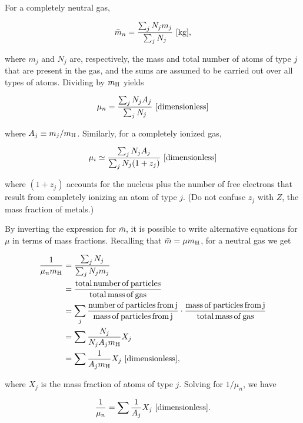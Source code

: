 \documentclass[a4paper,10pt]{article}
\begin{document}
{\noindent}For a completely neutral gas,

\begin{align*}
    \bar{m}_n = \dfrac{\sum_j N_jm_j}{\sum_j N_j} ~ [{\rm kg}],
\end{align*}

{\noindent}where $m_j$ and $N_j$ are, respectively, the mass and total number of atoms of type $j$ that are present in the gas, and the sums are assumed to be carried out over all types of atoms. Dividing by $m_{\rm H}$ yields

\begin{align*}
    \mu_n = \dfrac{\sum_j N_jA_j}{\sum_j N_j} ~ [{\rm dimensionless}]
\end{align*}

{\noindent}where $A_j\equiv m_j/m_{\rm H}$. Similarly, for a completely ionized gas,


\begin{align*}
    \mu_i \simeq \dfrac{\sum_j N_jA_j}{\sum_j N_j(1+z_j)} ~ [{\rm dimensionless}]
\end{align*}

{\noindent}where $(1+z_j)$ accounts for the nucleus plus the number of free electrons that result from completely ionizing an atom of type $j$. (Do not confuse $z_j$ with $Z$, the mass fraction of metals.)

{\noindent}By inverting the expression for $\bar{m}$, it is possible to write alternative equations for $\mu$ in terms of mass fractions. Recalling that $\bar{m}=\mu m_{\rm H}$, for a neutral gas we get

\begin{align*}
    \frac{1}{\mu_nm_{\rm H}} &= \dfrac{\sum_j N_j}{\sum_j N_jm_j} \\
    &= \frac{\rm total\,number\,of\,particles}{\rm total\,mass\,of\,gas} \\
    &= \sum_j \frac{\rm number\,of\,particles\,from\,j}{\rm mass\,of\,particles\,from\,j} \cdot \frac{\rm mass\,of\,particles\,from\,j}{\rm total\,mass\,of\,gas} \\
    &= \sum \frac{N_j}{N_jA_jm_{\rm H}} X_j \\
    &= \sum \frac{1}{A_jm_{\rm H}} X_j ~ [{\rm dimensionless}],
\end{align*}

{\noindent}where $X_j$ is the mass fraction of atoms of type $j$. Solving for $1/\mu_n$, we have

\begin{align*}
    \frac{1}{\mu_n} = \sum \frac{1}{A_j} X_j ~ [{\rm dimensionless}].
\end{align*}
\end{document}
